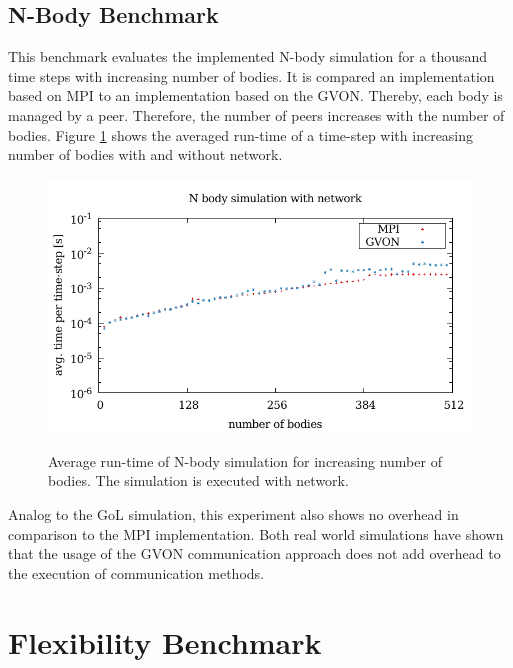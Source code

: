 \subsection{N-Body Benchmark}
This benchmark evaluates the implemented N-body simulation for a
thousand time steps with increasing number of bodies. It is compared
an implementation based on MPI to an implementation based on the GVON.
Thereby, each body is managed by a peer. Therefore, the number of
peers increases with the number of bodies. Figure
\ref{fig:nbody_laser} shows the averaged run-time of a time-step with
increasing number of bodies with and without network.

\begin{figure}[H]
  \includegraphics[width=\textwidth]{plots/50_nbody_network_laser}
  \label{fig:nbody_laser}
  \caption{Average run-time of N-body simulation for increasing
    number of bodies. The simulation is executed with network.}
\end{figure}

\noindent Analog to the GoL simulation, this experiment also shows no
overhead in comparison to the MPI implementation. Both real world
simulations have shown that the usage of the GVON communication
approach does not add overhead to the execution of communication
methods.

\section{Flexibility Benchmark}

